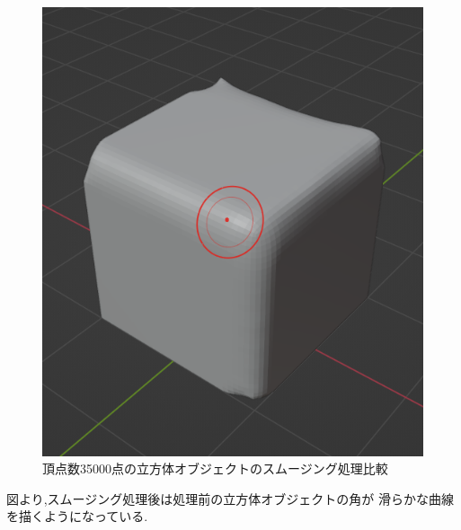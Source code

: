 \documentclass{ltjsreport}
\begin{document}
\begin{figure}[H]
\begin{minipage}{0.25\columnwidth}
			\includegraphics[width = \columnwidth]{../figs/SmoothingAfterCube.png}
			\end{minipage}
			\caption{頂点数35000点の立方体オブジェクトのスムージング処理比較}
			\label{fig:smoothingEX}
			\end{figure}
\vspace{-15pt}
			図より,スムージング処理後は処理前の立方体オブジェクトの角が
			滑らかな曲線を描くようになっている.
\end{document}

